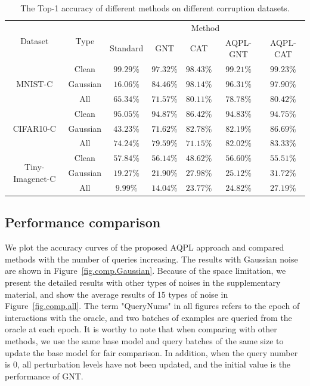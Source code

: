\documentclass[letterpaper]{article} %
\begin{document}
\begin{table}[!t]
\centering
\begin{tabular}{c|c|ccccc}
\hline
\multirow{2}{*}{Dataset} & \multirow{2}{*}{Type}
&\multicolumn{5}{c}{Method}\\
\cline{3-7}
&&Standard & GNT & CAT & AQPL-GNT & AQPL-CAT\\
\hline
\multirow{3}{*}{MNIST-C}
& Clean & $\bm{99.29\%}$ & $97.32\%$ & $98.43\%$ & $99.21\%$ & $99.23\%$ \\
& Gaussian & $16.06\%$ & $84.46\%$ & $\bm{98.14\%}$ & $96.31\%$ & $97.90\%$ \\
& All & $65.34\%$ & $71.57\%$ & $80.11\%$ & $78.78\%$ & $\bm{80.42\%}$ \\
\hline

\multirow{3}{*}{CIFAR10-C}
& Clean & $\bm{95.05\%}$ & $94.87\%$ & $86.42\%$ & $94.83\%$ & $94.75\%$ \\
& Gaussian & $43.23\%$ & $71.62\%$ & $82.78\%$ & $82.19\%$ & $\bm{86.69\%}$ \\
& All & $74.24\%$ & $79.59\%$ & $71.15\%$ & $82.02\%$ & $\bm{83.33\%}$ \\
\hline

\multirow{3}{*}{Tiny-Imagenet-C}
& Clean & $\bm{57.84\%}$ & $56.14\%$ & $48.62\%$ & $56.60\%$ & $55.51\%$ \\
& Gaussian & $19.27\%$ & $21.90\%$ & $27.98\%$ & $25.12\%$ & $\bm{31.72\%}$ \\
& All & $9.99\%$ & $14.04\%$ & $23.77\%$ & $24.82\%$ & $\bm{27.19\%}$ \\

\hline
\end{tabular}
\caption{The Top-1 accuracy of different methods on different corruption datasets.}
\label{table:comparison}
\end{table}






\subsection{Performance comparison}
We plot the accuracy curves of the proposed AQPL approach and compared methods with the number of queries increasing. The results with Gaussian noise are shown in Figure~\ref{fig.comp.Gaussian}. Because of the space limitation, we present the detailed results with other types of noises in the supplementary material, and show the average results of 15 types of noise in Figure~\ref{fig.comp.all}. The term "QueryNums" in all figures refers to the epoch of interactions with the oracle, and two batches of examples are queried from the oracle at each epoch. It is worthy to note that when comparing with other methods, we use the same base model and query batches of the same size to update the base model for fair comparison. In addition, when the query number is $0$, all perturbation levels have not been updated, and the initial value is the performance of GNT.
\end{document}
